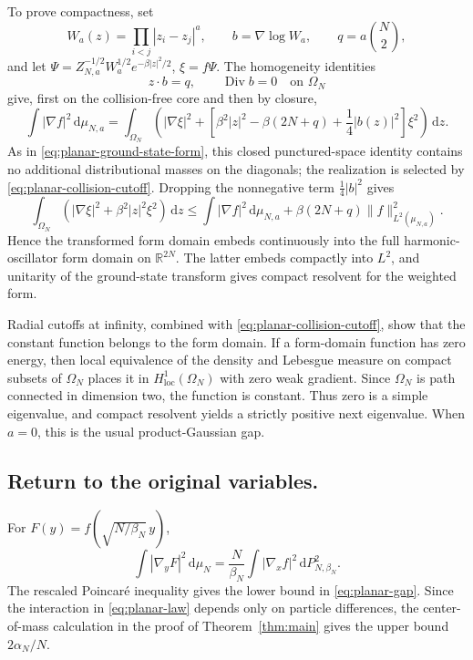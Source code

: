 \documentclass[12pt,reqno,letterpaper]{amsart}
\theoremstyle{definition}
\theoremstyle{remark}
\numberwithin{equation}{section}
\newcommand{\R}{\mathbb R}
\newcommand{\dd}{\,\mathrm d}
\newcommand{\be}{\beta}
\newcommand{\al}{\alpha}
\begin{document}
\begin{appendix}
To prove compactness, set
\[
 W_a(z)=\prod_{i<j}|z_i-z_j|^a,
 \qquad b=\nabla\log W_a,
 \qquad q=a\binom N2,
\]
and let
\(\Psi=Z_{N,a}^{-1/2}W_a^{1/2}e^{-\be|z|^2/2}\), \(\xi=f\Psi\).
The homogeneity identities
\[
 z\mathbin{\cdot}b=q,
 \qquad
 \operatorname{Div}b=0\quad\text{on }\Omega_N
\]
give, first on the collision-free core and then by closure,
\begin{equation}\label{eq:planar-many-transform}
 \int|\nabla f|^2\dd\mu_{N,a}
 =\int_{\Omega_N}\left(
 |\nabla\xi|^2+
 \left[\be^2|z|^2-\be(2N+q)+\frac14|b(z)|^2\right]\xi^2
 \right)\dd z.
\end{equation}
As in \eqref{eq:planar-ground-state-form}, this closed punctured-space
identity contains no additional distributional masses on the diagonals; the
realization is selected by \eqref{eq:planar-collision-cutoff}.  Dropping the
nonnegative term \(\frac14|b|^2\) gives
\[
 \int_{\Omega_N}(|\nabla\xi|^2+\be^2|z|^2\xi^2)\dd z
 \le
 \int|\nabla f|^2\dd\mu_{N,a}
 +\be(2N+q)\|f\|_{L^2(\mu_{N,a})}^2.
\]
Hence the transformed form domain embeds continuously into the full
harmonic-oscillator form domain on \(\R^{2N}\).  The latter embeds compactly
into \(L^2\), and unitarity of the ground-state transform gives compact
resolvent for the weighted form.

Radial cutoffs at infinity, combined with
\eqref{eq:planar-collision-cutoff}, show that the constant function belongs to
the form domain.  If a form-domain function has zero energy, then local
equivalence of the density and Lebesgue measure on compact subsets of
\(\Omega_N\) places it in \(H^1_{\mathrm{loc}}(\Omega_N)\) with zero weak
gradient.  Since \(\Omega_N\) is path connected in dimension two, the
function is constant.  Thus zero is a simple eigenvalue, and compact
resolvent yields a strictly positive next eigenvalue.  When \(a=0\), this is
the usual product-Gaussian gap.

\subsection{Return to the original variables.}
For \(F(y)=f(\sqrt{N/\be_N}\,y)\),
\[
 \int|\nabla_yF|^2\dd\mu_N
 =\frac{N}{\be_N}
 \int|\nabla_xf|^2\dd P_{N,\be_N}^{2}.
\]
The rescaled Poincar\'e inequality gives the lower bound in
\eqref{eq:planar-gap}.  Since the interaction in \eqref{eq:planar-law}
depends only on particle differences, the center-of-mass calculation in the
proof of Theorem~\ref{thm:main} gives the upper bound \(2\al_N/N\).  

\end{appendix}
\end{document}
